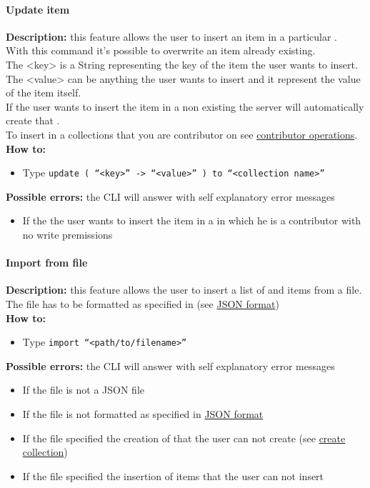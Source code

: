 \documentclass{scalatekids-article}
\begin{document}
\paragraph{Update item}
\label{sec:updateitem}
\textbf{Description:} this feature allows the user to insert an item in a particular .\\
With this command it's possible to overwrite an item already existing.\\
The <key> is a String representing the key of the item the user wants to insert.\\
The <value> can be anything the user wants to insert and it represent the value of the item itself.\\
If the user wants to insert the item in a non existing  the server
will automatically create that .\\
To insert in a collections that you are contributor on see \hyperref[sec:contributoroperations]{contributor operations}.\\
\textbf{How to:}
\begin{itemize}
\item Type \texttt{update ( ``<key>'' -> ``<value>'' ) to ``<collection name>''}
\end{itemize}
\textbf{Possible errors:} the CLI will answer with self explanatory error messages
\begin{itemize}
\item If the  the user wants to insert the item in a  in which he is a contributor with no write premissions
\end{itemize}

\paragraph{Import from file}
\label{sec:import}
\textbf{Description:} this feature allows the user to insert a list of  and items from a file.\\
The file has to be formatted as specified in (see \hyperref[sec:JSONFormat]{JSON format})\\
\textbf{How to:}
\begin{itemize}
\item Type \texttt{import ``<path/to/filename>''}
\end{itemize}
\textbf{Possible errors:} the CLI will answer with self explanatory error messages
\begin{itemize}
\item If the file is not a JSON file
\item If the file is not formatted as specified in \hyperref[sec:JSONFormat]{JSON format}
\item If the file specified the creation of  that the user can not create (see \hyperref[sec:createcollection]{create collection})
\item If the file specified the insertion of items that the user can not insert
\end{itemize}
\end{document}
